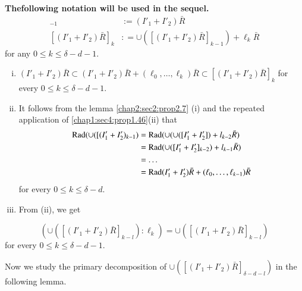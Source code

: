 \textbf{The\pageoriginale following notation will be used in the sequel.}
\begin{align*}
    [(I'_1+I'_2)\bar{R}]_{-1} &:= (I'_1+I'_2)\bar{R}\\
    [(I'_1+I'_2)\bar{R}]_{k} &: = \cup ([(I'_1+I'_2)\bar{R}]_{k-1})+\ell_k \bar{R}
  \end{align*}
  for any $0 \leq k \leq \delta-d-1$.

\setcounter{remarks}{8}
\begin{remarks}\label{chap2:sec3:rem2.9}
  \begin{enumerate}[(i)]
  \item $(I'_1+I'_2)\bar{R}\subset (I'_1+I'_2)\bar{R}+(\ell_0, \ldots,
    \ell _k)\bar{R}\subset [(I'_1+I'_2)\bar{R}]_k$ 
    for every $0 \leq k \leq \delta-d-1$.
    
  \item It follows from the lemma \ref{chap2:sec2:prop2.7} (i) and the repeated
    application of \ref{chap1:sec4:prop1.46}(ii) that 
    \begin{align*}
      \operatorname{Rad} (\cup([(I'_1+I'_2)_{k-1}) &= \operatorname{Rad}
        (\cup(\cup([I'_1+I'_2])+l_{k-2} \bar{R})\\ 
        &=\operatorname{Rad} (\cup([I'_1+I'_2]_{k-2})+l_{k-1}\bar{R})\\
        &= \ldots\\
        &=\operatorname{Rad} (I'_1+I'_2)\bar{R}+(\ell_0,\ldots, \ell_{k-1})\bar{R}
    \end{align*}
    for every $0 \leq k \leq \delta-d$.    
  \item From (ii), we get
  \end{enumerate}
  $$
  (\cup ([(I'_1+I'_2)\bar{R}]_{k-l}):\ell_k)=\cup ([(I'_1+I'_2)\bar{R}]_{k-l})
  $$
  for every $0 \leq k \leq \delta-d-1$.
\end{remarks}

Now we study the primary decomposition of $\cup ([(I'_1 +
  I'_2)\bar{R}]_{\delta-d-l})$ in the following lemma. 

